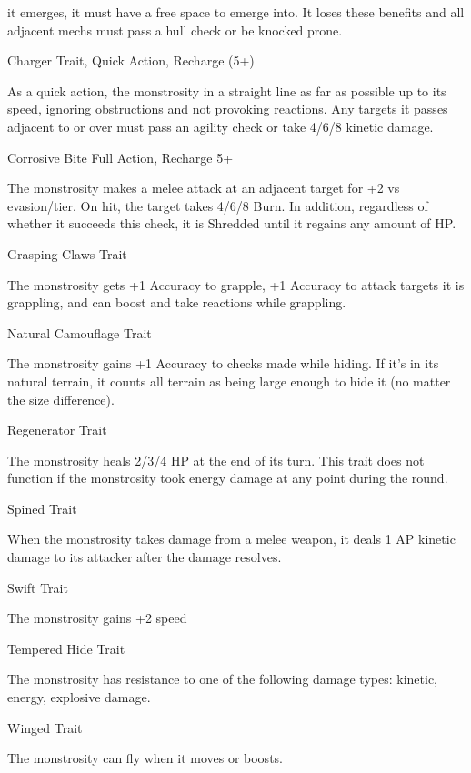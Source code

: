 it emerges, it must have a free space to emerge into. It loses these benefits and all adjacent  
mechs must pass a hull check or be knocked prone.
 

Charger  
Trait, Quick Action, Recharge (5+)
 
As a quick action, the monstrosity in a straight line as far as possible up to its speed, ignoring  
obstructions and not provoking reactions. Any targets it passes adjacent to or over must pass an  
agility check or take 4/6/8 kinetic damage.
 

Corrosive Bite  
Full Action, Recharge 5+
 
The monstrosity makes a melee attack at an adjacent target for +2 vs evasion/tier. On hit, the  
target takes 4/6/8 Burn. In addition, regardless of whether it succeeds this check, it is Shredded  
until it regains any amount of HP.
 

Grasping Claws  
Trait
 
The monstrosity gets +1 Accuracy to grapple, +1 Accuracy to attack targets it is grappling, and  
can boost and take reactions while grappling.
 

Natural Camouflage  
Trait
 
The monstrosity gains +1 Accuracy to checks made while hiding. If it’s in its natural terrain, it  
counts all terrain as being large enough to hide it (no matter the size difference).
 

Regenerator  
Trait
 
The monstrosity heals 2/3/4 HP at the end of its turn. This trait does not function if the  
monstrosity took energy damage at any point during the round.
 

Spined  
Trait
 
When the monstrosity takes damage from a melee weapon, it deals 1 AP kinetic damage to its  
attacker after the damage resolves.
 

Swift  
Trait
 
The monstrosity gains +2 speed
 

Tempered Hide  
Trait
 
The monstrosity has resistance to one of the following damage types: kinetic, energy, explosive  
damage.
 

                                                                                                                    


Winged  
Trait
 
The monstrosity can fly when it moves or boosts.
 

